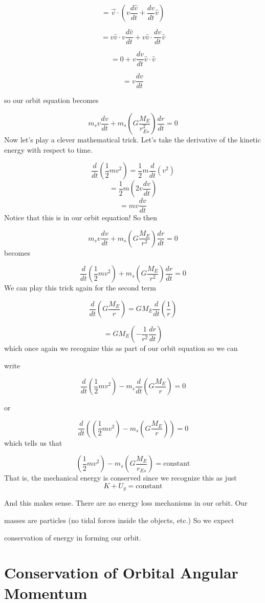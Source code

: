 $$=\overrightarrow{v}\cdot \left( v\frac{d\hat{v}}{dt}+\frac{dv}{dt}\hat{v}\right)
$$

$$=v\hat{v}\cdot v\frac{d\hat{v}}{dt}+v\hat{v}\cdot \frac{dv}{dt}\hat{v}$$

$$=0+v\frac{dv}{dt}\hat{v}\cdot \hat{v}$$

$$=v\frac{dv}{dt}$$

so our orbit equation becomes

$$m_{s}v\frac{dv}{dt}+m_{s}\left( G\frac{M_{E}}{r_{Es}^{2}}\right) \frac{dr}{dt}=0
$$
Now let's play a clever mathematical trick. Let's take the derivative of the
kinetic energy with respect to time.

$$\frac{d}{dt}\left( \frac{1}{2}mv^{2}\right) =\frac{1}{2}m\frac{d}{dt}\left(v^{2}\right) 
$$%
$$=\frac{1}{2}m\left( 2v\frac{dv}{dt}\right) 
$$%
$$=mv\frac{dv}{dt}$$%
Notice that this is in our orbit equation! So then%

$$m_{s}v\frac{dv}{dt}+m_{s}\left( G\frac{M_{E}}{r^{2}}\right) \frac{dr}{dt}=0
$$%
becomes 

$$\frac{d}{dt}\left( \frac{1}{2}mv^{2}\right) +m_{s}\left( G\frac{M_{E}}{r^{2}}\right) \frac{dr}{dt}=0$$%
We can play this trick again for the second term%

$$
\frac{d}{dt}\left( G\frac{M_{E}}{r}\right) =GM_{E}\frac{d}{dt}\left( \frac{1}{r}\right) 
$$
	
$$
=GM_{E}\left( -\frac{1}{r^{2}}\frac{dr}{dt}\right) 
$$
which once again we recognize this as part of our orbit equation so we can

write 

$$\frac{d}{dt}\left( \frac{1}{2}mv^{2}\right) -m_{s}\frac{d}{dt}\left( G\frac{M_{E}}{r}\right) =0$$

or 

$$\frac{d}{dt}\left( \left( \frac{1}{2}mv^{2}\right) -m_{s}\left( G\frac{M_{E}}{r}\right) \right) =0 
$$%
which tells us that 

$$
\left( \frac{1}{2}mv^{2}\right) -m_{s}\left( G\frac{M_{E}}{r_{Es}}\right) =\text{constant} 
$$
That is, the mechanical energy is conserved since we recognize this as just 
$$K+U_{g}=\text{constant} $$

And this makes sense. There are no energy loss mechanisms in our orbit. Our

masses are particles (no tidal forces inside the objects, etc.) So we expect

conservation of energy in forming our orbit.


\section{Conservation of Orbital Angular Momentum}


